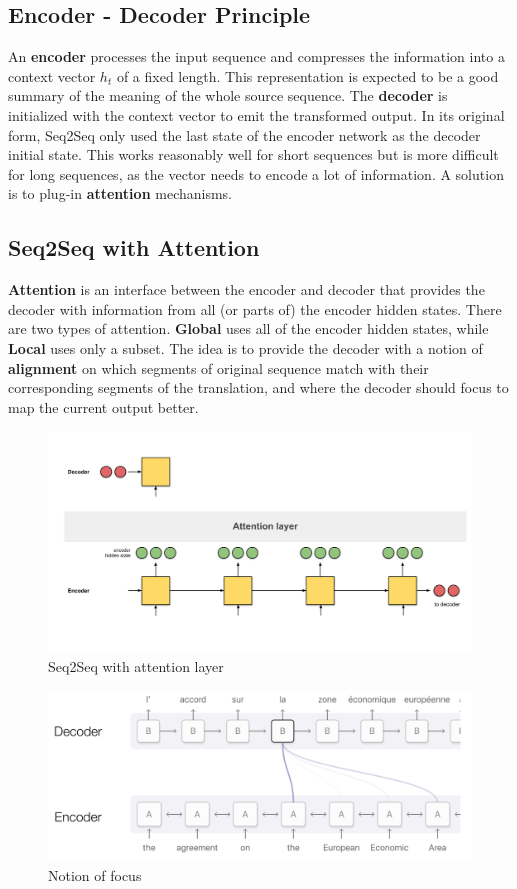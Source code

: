 \documentclass[11pt]{article}
\begin{document}
\subsection{Encoder - Decoder Principle}
An \textbf{encoder} processes the input sequence and compresses the information into a context vector $h_t$ of a fixed length. This representation is expected to be a good summary of the meaning of the whole source sequence. The \textbf{decoder} is initialized with the context vector to emit the transformed output. In its original form, Seq2Seq only used the last state of the encoder network as the decoder initial state. This works reasonably well for short sequences but is more difficult for long sequences, as the vector needs to encode a lot of information. A solution is to plug-in \textbf{attention} mechanisms.

\subsection{Seq2Seq with Attention}
\textbf{Attention} is an interface between the encoder and decoder that provides the decoder with information from all (or parts of) the encoder hidden states. There are two types of attention. \textbf{Global} uses all of the encoder hidden states, while \textbf{Local} uses only a subset. The idea is to provide the decoder with a notion of \textbf{alignment} on which segments of original sequence match with their corresponding segments of the translation, and where the decoder should focus to map the current output better.

\begin{figure}[tbh]
	\centering
	\includegraphics[width=0.6\linewidth]{img/seq2seq_attention}
	\caption{Seq2Seq with attention layer}
	\label{fig:seq2seqattention}
\end{figure}

\begin{figure}[tbh]
	\centering
	\includegraphics[width=0.6\linewidth]{img/seq2seq_attention_mapper}
	\caption{Notion of focus}
	\label{fig:seq2seqattentionmapper}
\end{figure}
\end{document}
